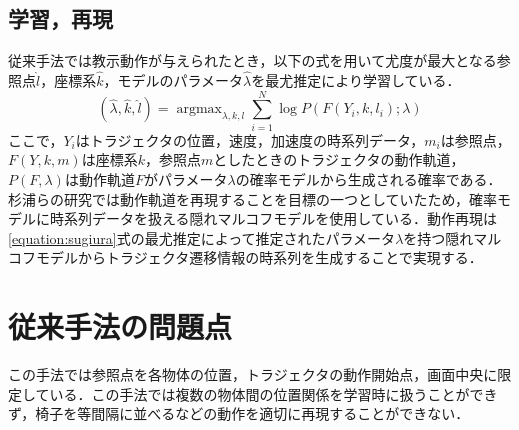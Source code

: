 \subsection{学習，再現}

従来手法では教示動作が与えられたとき，以下の式を用いて尤度が最大となる参照点$\hat{l}$，座標系$\hat{k}$，モデルのパラメータ$\hat{λ}$を最尤推定により学習している．
\begin{equation}
	\label{equation:sugiura}
	(\hat{λ} , \hat{k} , \hat{l}) = \mathop{\arg\max}_{λ , k , l}\sum_{i=1}^{N}\log P(F(Y_{i} , k , l_{i}) ; λ)
\end{equation}
ここで，$Y_{i}$はトラジェクタの位置，速度，加速度の時系列データ，$m_{i}$は参照点，$F(Y , k , m)$は座標系$k$，参照点$m$としたときのトラジェクタの動作軌道，$P(F,λ)$は動作軌道$F$がパラメータ$λ$の確率モデルから生成される確率である．杉浦らの研究では動作軌道を再現することを目標の一つとしていたため，確率モデルに時系列データを扱える隠れマルコフモデルを使用している．動作再現は\ref{equation:sugiura}式の最尤推定によって推定されたパラメータ$λ$を持つ隠れマルコフモデルからトラジェクタ遷移情報の時系列を生成することで実現する．

\section{従来手法の問題点}

この手法では参照点を各物体の位置，トラジェクタの動作開始点，画面中央に限定している．この手法では複数の物体間の位置関係を学習時に扱うことができず，椅子を等間隔に並べるなどの動作を適切に再現することができない．